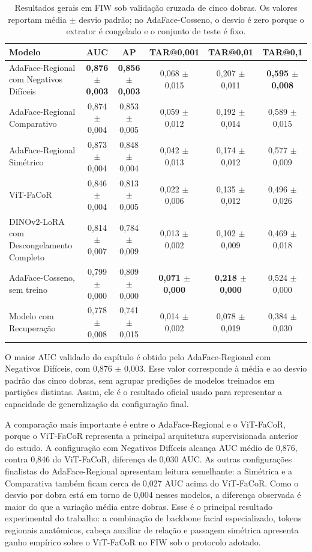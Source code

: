 \begin{table}[h]
\centering
\scriptsize
\setlength{\tabcolsep}{3pt}
\caption{Resultados gerais em FIW sob validação cruzada de cinco dobras. Os valores reportam média $\pm$ desvio padrão; no AdaFace-Cosseno, o desvio é zero porque o extrator é congelado e o conjunto de teste é fixo.}
\label{tab:fiw_main}
\begin{tabularx}{\textwidth}{Xccccc}
\hline
\textbf{Modelo} & \textbf{AUC} & \textbf{AP} & \textbf{TAR@0{,}001} & \textbf{TAR@0{,}01} & \textbf{TAR@0{,}1} \\
\hline
AdaFace-Regional com Negativos Difíceis & \textbf{0{,}876 $\pm$ 0{,}003} & \textbf{0{,}856 $\pm$ 0{,}003} & 0{,}068 $\pm$ 0{,}015 & 0{,}207 $\pm$ 0{,}011 & \textbf{0{,}595 $\pm$ 0{,}008} \\
AdaFace-Regional Comparativo & 0{,}874 $\pm$ 0{,}004 & 0{,}853 $\pm$ 0{,}005 & 0{,}059 $\pm$ 0{,}012 & 0{,}192 $\pm$ 0{,}014 & 0{,}589 $\pm$ 0{,}015 \\
AdaFace-Regional Simétrico & 0{,}873 $\pm$ 0{,}004 & 0{,}848 $\pm$ 0{,}004 & 0{,}042 $\pm$ 0{,}013 & 0{,}174 $\pm$ 0{,}012 & 0{,}577 $\pm$ 0{,}009 \\
ViT-FaCoR & 0{,}846 $\pm$ 0{,}004 & 0{,}813 $\pm$ 0{,}005 & 0{,}022 $\pm$ 0{,}006 & 0{,}135 $\pm$ 0{,}012 & 0{,}496 $\pm$ 0{,}026 \\
DINOv2-LoRA com Descongelamento Completo & 0{,}814 $\pm$ 0{,}007 & 0{,}784 $\pm$ 0{,}009 & 0{,}013 $\pm$ 0{,}002 & 0{,}102 $\pm$ 0{,}009 & 0{,}469 $\pm$ 0{,}018 \\
AdaFace-Cosseno, sem treino & 0{,}799 $\pm$ 0{,}000 & 0{,}809 $\pm$ 0{,}000 & \textbf{0{,}071 $\pm$ 0{,}000} & \textbf{0{,}218 $\pm$ 0{,}000} & 0{,}524 $\pm$ 0{,}000 \\
Modelo com Recuperação & 0{,}778 $\pm$ 0{,}008 & 0{,}741 $\pm$ 0{,}015 & 0{,}014 $\pm$ 0{,}002 & 0{,}078 $\pm$ 0{,}019 & 0{,}384 $\pm$ 0{,}030 \\
\hline
\end{tabularx}
\end{table}

O maior AUC validado do capítulo é obtido pelo AdaFace-Regional com Negativos Difíceis, com 0,876 $\pm$ 0,003. Esse valor corresponde à média e ao desvio padrão das cinco dobras, sem agrupar predições de modelos treinados em partições distintas. Assim, ele é o resultado oficial usado para representar a capacidade de generalização da configuração final.

A comparação mais importante é entre o AdaFace-Regional e o ViT-FaCoR, porque o ViT-FaCoR representa a principal arquitetura supervisionada anterior do estudo. A configuração com Negativos Difíceis alcança AUC médio de 0,876, contra 0,846 do ViT-FaCoR, diferença de 0,030 AUC. As outras configurações finalistas do AdaFace-Regional apresentam leitura semelhante: a Simétrica e a Comparativa também ficam cerca de 0,027 AUC acima do ViT-FaCoR. Como o desvio por dobra está em torno de 0,004 nesses modelos, a diferença observada é maior do que a variação média entre dobras. Esse é o principal resultado experimental do trabalho: a combinação de backbone facial especializado, tokens regionais anatômicos, cabeça auxiliar de relação e passagem simétrica apresenta ganho empírico sobre o ViT-FaCoR no FIW sob o protocolo adotado.

